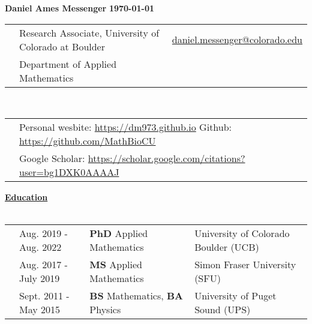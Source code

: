 \documentclass[letterpaper,11pt,oneside]{article}
\newcommand{\headr}[1]{\vspace{10pt}\uline{\Large{\textbf{#1}} \hfill } \\ \vspace{-10pt}\\}
\begin{document}
%
\noindent 
\LARGE{\textbf{Daniel Ames Messenger} \hspace{2.6in} \textbf{\monthyeardate\today}} 
\normalsize
%
%
\begin{center}
\begin{tabular}{@{} p{0.01cm} @{} p{10cm} @{} p{6.5cm}@{} }
& Research Associate, University of Colorado at Boulder & \hspace{0.5in} \href{mailto:daniel.messenger@colorado.edu}{daniel.messenger@colorado.edu} \\
& Department of Applied Mathematics    & \hspace{3.2cm}   \\
\end{tabular}\\ \vspace{0.25cm}
\begin{tabular}{@{} p{0.01cm} @{} p{16.5cm}@{} }
& Personal wesbite: \url{https://dm973.github.io} \hspace{1.5cm} Github: \url{https://github.com/MathBioCU} \\
& Google Scholar: \url{https://scholar.google.com/citations?user=bg1DXK0AAAAJ}
\end{tabular}
\end{center}


\headr{Education}
 
\begin{tabular}{@{} p{0.01cm} @{} p{4.3cm} @{} p{5.7cm} @{} p{8cm}@{} }
& Aug. 2019 - Aug. 2022 & \textbf{PhD} Applied Mathematics & University of Colorado Boulder (UCB)\\ 
& Aug. 2017 - July 2019 & \textbf{MS} Applied Mathematics & Simon Fraser University (SFU)\\ 
& Sept. 2011 - May 2015  & \textbf{BS} Mathematics, \textbf{BA} Physics & University of Puget Sound (UPS)
\end{tabular}

\end{document}
